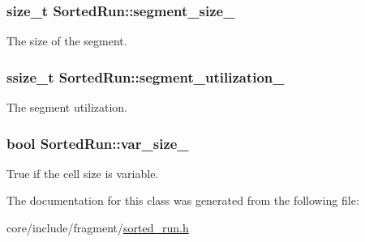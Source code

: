 \subsubsection[{segment\+\_\+size\+\_\+}]{\setlength{\rightskip}{0pt plus 5cm}size\+\_\+t Sorted\+Run\+::segment\+\_\+size\+\_\+\hspace{0.3cm}{\ttfamily [private]}}\label{classSortedRun_a713facebc827efc8f48d784d970531df}
The size of the segment. \hypertarget{classSortedRun_a06c696f9cb490fe920f620ef42cbf665}{}
\subsubsection[{segment\+\_\+utilization\+\_\+}]{\setlength{\rightskip}{0pt plus 5cm}ssize\+\_\+t Sorted\+Run\+::segment\+\_\+utilization\+\_\+\hspace{0.3cm}{\ttfamily [private]}}\label{classSortedRun_a06c696f9cb490fe920f620ef42cbf665}
The segment utilization. \hypertarget{classSortedRun_a6777a9e8661c70fac26b87bfe0a1b4fd}{}
\subsubsection[{var\+\_\+size\+\_\+}]{\setlength{\rightskip}{0pt plus 5cm}bool Sorted\+Run\+::var\+\_\+size\+\_\+\hspace{0.3cm}{\ttfamily [private]}}\label{classSortedRun_a6777a9e8661c70fac26b87bfe0a1b4fd}
True if the cell size is variable. 

The documentation for this class was generated from the following file\+:\begin{DoxyCompactItemize}
\item 
core/include/fragment/\hyperlink{sorted__run_8h}{sorted\+\_\+run.\+h}\end{DoxyCompactItemize}
